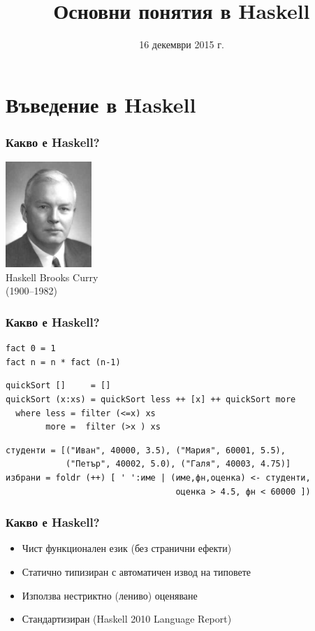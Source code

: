 \documentclass{beamer}
\title{Основни понятия в Haskell}
\date{16 декември 2015 г.}
\begin{document}
\begin{frame}
  \titlepage
\end{frame}


\section{Въведение в Haskell}

\begin{frame}
  \frametitle{Какво е Haskell?}
  \pause
  \begin{center}
    \includegraphics[height=4cm]{images/HaskellBCurry.jpg}\\
    Haskell Brooks Curry\\
    (1900--1982)
  \end{center}
\end{frame}

\begin{frame}[fragile]
  \frametitle{Какво е Haskell?}
  \pause
\begin{verbatim}
fact 0 = 1
fact n = n * fact (n-1)
\end{verbatim}
  \pause
\begin{verbatim}
quickSort []     = []
quickSort (x:xs) = quickSort less ++ [x] ++ quickSort more
  where less = filter (<=x) xs
        more =  filter (>x ) xs
\end{verbatim}
  \pause
\begin{verbatim}
студенти = [("Иван", 40000, 3.5), ("Мария", 60001, 5.5),
            ("Петър", 40002, 5.0), ("Галя", 40003, 4.75)]
избрани = foldr (++) [ ' ':име | (име,фн,оценка) <- студенти,
                                  оценка > 4.5, фн < 60000 ])
\end{verbatim}
\end{frame}

\begin{frame}
  \frametitle{Какво е Haskell?}
  \pause
  \begin{itemize}
  \item Чист функционален език (без странични ефекти)
  \item Статично типизиран с автоматичен извод на типовете
  \item Използва нестриктно (лениво) оценяване
  \item Стандартизиран (Haskell 2010 Language Report)
  \end{itemize}
\end{frame}
\end{document}
